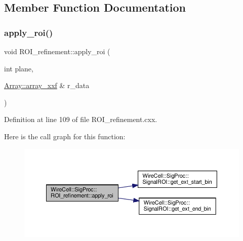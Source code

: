 \subsection{Member Function Documentation}
\mbox{\label{class_wire_cell_1_1_sig_proc_1_1_r_o_i__refinement_ad9fa04700e5990b6f2dee69eaefdaf49}} 
\subsubsection{\texorpdfstring{apply\+\_\+roi()}{apply\_roi()}}
{\footnotesize\ttfamily void R\+O\+I\+\_\+refinement\+::apply\+\_\+roi (\begin{DoxyParamCaption}\item[{int}]{plane,  }\item[{\hyperlink{namespace_wire_cell_1_1_array_ab565fef5e33632bb02f0ed4be803020c}{Array\+::array\+\_\+xxf} \&}]{r\+\_\+data }\end{DoxyParamCaption})}



Definition at line 109 of file R\+O\+I\+\_\+refinement.\+cxx.

Here is the call graph for this function\+:
\nopagebreak
\begin{figure}[H]
\begin{center}
\leavevmode
\includegraphics[width=350pt]{class_wire_cell_1_1_sig_proc_1_1_r_o_i__refinement_ad9fa04700e5990b6f2dee69eaefdaf49_cgraph}
\end{center}
\end{figure}
\mbox{\label{class_wire_cell_1_1_sig_proc_1_1_r_o_i__refinement_a022c40a41ac572f1864dbd345c04159d}} 
